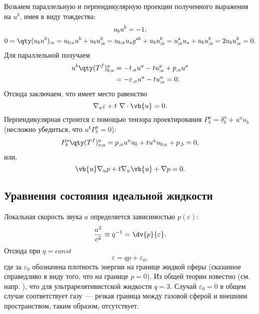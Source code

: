 \documentclass[\docroot/reports/draft/report.tex]{subfiles}
\begin{document}
    Возьмем параллельную и перпендикулярную проекции полученного выражения на $u^b$, имея в виду тождества:
    \begin{gather*}
        u_b u^b = -1 , \\
        0 = \qty(u_b u^b)_{;a} = u_{b;a} u^b + u_b u^b_{;a}
          = u_{b;a} u_s g^{sb} + u_b u^b_{;a}
          = u^s_{;a} u_s + u_b u^b_{;a}
          = 2 u_b u^b_{;a}
          = 0 .
    \end{gather*}
    Для параллельной получаем
    \begin{equation*}\begin{aligned}
        u^b \qty(T^f)^a_{b;a} &= - t_{,a} u^a - t u^a_{;a} + p_{,a} u^a \\
                              &= - \varepsilon_{,a} u^a - t u^a_{;a} = 0 .
    \end{aligned}\end{equation*}
    Отсюда заключаем, что имеет место равенство
    \begin{equation}
        \nabla_u \varepsilon + t\ \nabla \cdot \vb{u} = 0 .
    \end{equation}
    Перпендикулярная строится с помощью тензора проектирования $P^a_b = \delta^a_b + u^a u_b$ (несложно убедиться, что $u^b P^a_b = 0$):
    \begin{equation*}\begin{aligned}
        P^s_b \qty(T^f)^a_{s;a} = p_{,a} u^a u_b + t u^a u_{b;a} + p_{,b} = 0 ,
    \end{aligned}\end{equation*}
    или,
    \begin{equation}
        \vb{u} \nabla_u p + t \nabla_u \vb{u} + \nabla p = 0 .
    \end{equation}

\subsection{Уравнения состояния идеальной жидкости}

    Локальная скорость звука $a$ определяется зависимостью $p(\varepsilon)$:
    \begin{equation*}
        \frac{a^2}{c^2} \equiv q^{-1} = \dv{p}{\varepsilon} .
    \end{equation*}
    Отсюда при $q = const$
    \begin{equation*}
        \varepsilon = q p + \varepsilon_0 ,
    \end{equation*}
    где за $\varepsilon_0$ обозначена плотность энергии на границе жидкой сферы (сказанное справедливо в виду того, что на границе $p = 0$). Из общей теории известно (см. напр. \cite{landau_v5}), что для ультрарелятивистской жидкости $q = 3$. Случай $\varepsilon_0 = 0$ в общем случае соответствует газу~--- резкая граница между газовой сферой и внешним пространством, таким образом, отсутствует.
\end{document}
